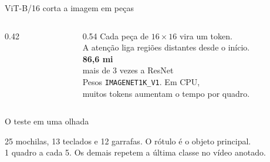 \documentclass[aspectratio=169,11pt]{beamer}
\begin{document}
\begin{frame}{ViT-B/16 corta a imagem em peças}
    \begin{columns}[c]
        \begin{column}{0.42\textwidth}
            \begin{center}
            \end{center}
        \end{column}
        \begin{column}{0.54\textwidth}
            Cada peça de \(16\times16\) vira um token.\\
            A atenção liga regiões distantes desde o início.\\[6pt]
            \textcolor{vit}{\fontsize{36}{40}\selectfont\bfseries 86,6 mi}\\
            {\color{muted} mais de 3 vezes a ResNet}\\[6pt]
            Pesos \texttt{IMAGENET1K\_V1}. Em CPU,\\
            muitos tokens aumentam o tempo por quadro.
        \end{column}
    \end{columns}
\end{frame}

\begin{frame}{O teste em uma olhada}
    \begin{center}
    \end{center}
    \vspace{1mm}
    {\color{muted}\small 25 mochilas, 13 teclados e 12 garrafas. O rótulo é o objeto principal.\\
    1 quadro a cada 5. Os demais repetem a última classe no vídeo anotado.}
\end{frame}
\end{document}
